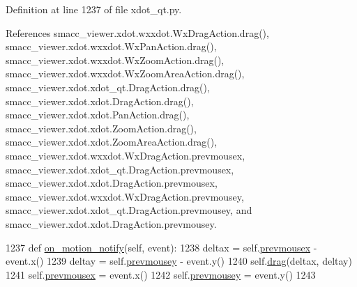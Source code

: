 Definition at line 1237 of file xdot\+\_\+qt.\+py.



References smacc\+\_\+viewer.\+xdot.\+wxxdot.\+Wx\+Drag\+Action.\+drag(), smacc\+\_\+viewer.\+xdot.\+wxxdot.\+Wx\+Pan\+Action.\+drag(), smacc\+\_\+viewer.\+xdot.\+wxxdot.\+Wx\+Zoom\+Action.\+drag(), smacc\+\_\+viewer.\+xdot.\+wxxdot.\+Wx\+Zoom\+Area\+Action.\+drag(), smacc\+\_\+viewer.\+xdot.\+xdot\+\_\+qt.\+Drag\+Action.\+drag(), smacc\+\_\+viewer.\+xdot.\+xdot.\+Drag\+Action.\+drag(), smacc\+\_\+viewer.\+xdot.\+xdot.\+Pan\+Action.\+drag(), smacc\+\_\+viewer.\+xdot.\+xdot.\+Zoom\+Action.\+drag(), smacc\+\_\+viewer.\+xdot.\+xdot.\+Zoom\+Area\+Action.\+drag(), smacc\+\_\+viewer.\+xdot.\+wxxdot.\+Wx\+Drag\+Action.\+prevmousex, smacc\+\_\+viewer.\+xdot.\+xdot\+\_\+qt.\+Drag\+Action.\+prevmousex, smacc\+\_\+viewer.\+xdot.\+xdot.\+Drag\+Action.\+prevmousex, smacc\+\_\+viewer.\+xdot.\+wxxdot.\+Wx\+Drag\+Action.\+prevmousey, smacc\+\_\+viewer.\+xdot.\+xdot\+\_\+qt.\+Drag\+Action.\+prevmousey, and smacc\+\_\+viewer.\+xdot.\+xdot.\+Drag\+Action.\+prevmousey.


\begin{DoxyCode}
1237     \textcolor{keyword}{def }\hyperlink{classsmacc__viewer_1_1xdot_1_1xdot__qt_1_1DragAction_a4188c07d4c6e08c97845991230f6cb8e}{on\_motion\_notify}(self, event):
1238         deltax = self.\hyperlink{classsmacc__viewer_1_1xdot_1_1xdot__qt_1_1DragAction_a900f12641fa6a10b8f1481533c50705e}{prevmousex} - event.x()
1239         deltay = self.\hyperlink{classsmacc__viewer_1_1xdot_1_1xdot__qt_1_1DragAction_aee3f8cd173e1043a06b4a08d9f84f536}{prevmousey} - event.y()
1240         self.\hyperlink{classsmacc__viewer_1_1xdot_1_1xdot__qt_1_1DragAction_ad60662b55c4e960c5fde70386c526244}{drag}(deltax, deltay)
1241         self.\hyperlink{classsmacc__viewer_1_1xdot_1_1xdot__qt_1_1DragAction_a900f12641fa6a10b8f1481533c50705e}{prevmousex} = event.x()
1242         self.\hyperlink{classsmacc__viewer_1_1xdot_1_1xdot__qt_1_1DragAction_aee3f8cd173e1043a06b4a08d9f84f536}{prevmousey} = event.y()
1243 
\end{DoxyCode}


